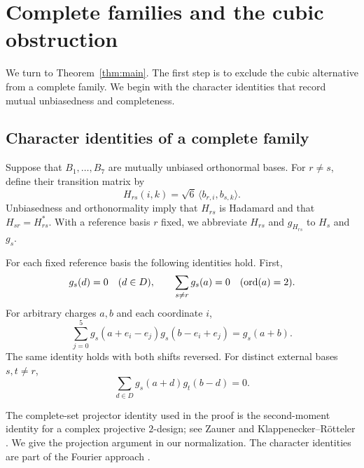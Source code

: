 \section{Complete families and the cubic obstruction}\label{sec:complete-family}

We turn to Theorem~\ref{thm:main}. The first step is to exclude the
cubic alternative from a complete family. We begin with the character
identities that record mutual unbiasedness and completeness.

\subsection{Character identities of a complete family}

Suppose that
\(B_1,\ldots,B_7\) are mutually unbiased orthonormal bases.
For \(r\ne s\), define their transition matrix by
\[
 H_{rs}(i,k)=\sqrt6\,\langle b_{r,i},b_{s,k}\rangle.
\]
Unbiasedness and orthonormality imply that \(H_{rs}\) is Hadamard and that
\(H_{sr}=H_{rs}^*\). With a reference basis \(r\) fixed, we abbreviate
\(H_{rs}\) and \(g_{H_{rs}}\) to \(H_s\) and \(g_s\).

\begin{lemma}\label{lem:basic}
For each fixed reference basis the following identities hold.
First,
\begin{equation}\label{eq:order-two}
 g_s(d)=0\quad(d\in D),
 \qquad
 \sum_{s\ne r}g_s(a)=0\quad(\operatorname{ord}(a)=2).
\end{equation}
For arbitrary charges \(a,b\) and each coordinate \(i\),
\begin{equation}\label{eq:same-matrix}
 \sum_{j=0}^5 g_s(a+e_i-e_j)g_s(b-e_i+e_j)=g_s(a+b).
\end{equation}
The same identity holds with both shifts reversed. For distinct external
bases \(s,t\ne r\),
\begin{equation}\label{eq:different-matrices}
 \sum_{d\in D}g_s(a+d)g_t(b-d)=0.
\end{equation}
\end{lemma}

The complete-set projector identity used in the proof is the
second-moment identity for a complex projective $2$-design; see
Zauner \cite[Satz~2.19]{Zauner1999} and
Klappenecker--R\"otteler \cite[Theorem~3]{KlappeneckerRotteler2005}.
We give the projection argument in our normalization. The character
identities are part of the Fourier approach
\cite{Matolcsi2012,MatolcsiRuzsaWeiner2013}.

